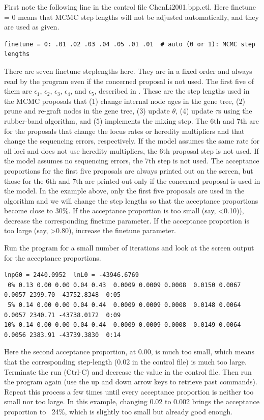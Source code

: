 \documentclass[a4paper]{book}
\numberwithin{equation}{section} \renewcommand{\baselinestretch}{0.55}
\begin{document}
First note the following line in the control file ChenLi2001.bpp.ctl.
Here finetune = 0 means that MCMC step lengths will not be adjusted
automatically, and they are used as given.
\begin{verbatim}
finetune = 0: .01 .02 .03 .04 .05 .01 .01  # auto (0 or 1): MCMC step lengths
\end{verbatim}
There are seven finetune steplengths here.  They are in a fixed order
and always read by the program even if the concerned proposal is not
used.  The first five of them are $\epsilon_1$, $\epsilon_2$,
$\epsilon_3$, $\epsilon_4$, and $\epsilon_5$, described in
\citep{Rannala2003}. These are the step lengths used in the MCMC
proposals that (1) change internal node ages in the gene tree, (2)
prune and re-graft nodes in the gene tree, (3) update $\theta$, (4)
update $\tau$s using the rubber-band algorithm, and (5) implements the
mixing step.  The 6th and 7th are for the proposals that change the
locus rates or heredity multipliers and that change the sequencing
errors, respectively.  If the model assumes the same rate for all loci
and does not use heredity multipliers, the 6th proposal step is not
used.  If the model assumes no sequencing errors, the 7th step is not
used.  The acceptance proportions for the first five proposals are
always printed out on the screen, but those for the 6th and 7th are
printed out only if the concerned proposal is used in the model.  In
the example above, only the first five proposals are used in the
algorithm and we will change the step lengths so that the acceptance
proportions become close to 30\%.  If the acceptance proportion is too
small (say, <0.10)), decrease the corresponding finetune parameter.
If the acceptance proportion is too large (say, >0.80), increase the
finetune parameter.

Run the program for a small number of iterations and look at the
screen output for the acceptance proportions.
{\small
\begin{verbatim}
lnpG0 = 2440.0952  lnL0 = -43946.6769
 0% 0.13 0.00 0.00 0.04 0.43  0.0009 0.0009 0.0008  0.0150 0.0067 0.0057 2399.70 -43752.8348  0:05
 5% 0.14 0.00 0.00 0.04 0.44  0.0009 0.0009 0.0008  0.0148 0.0064 0.0057 2340.71 -43738.0172  0:09
10% 0.14 0.00 0.00 0.04 0.44  0.0009 0.0009 0.0008  0.0149 0.0064 0.0056 2383.91 -43739.3830  0:14
\end{verbatim}
}
Here the second acceptance proportion, at 0.00, is much too small,
which means that the corresponding step-length (0.02 in the control
file) is much too large.  Terminate the run (Ctrl-C) and decrease the
value in the control file.  Then run the program again (use the up and
down arrow keys to retrieve past commands).  Repeat this process a few
times until every acceptance proportion is neither too small nor too
large.  In this example, changing 0.02 to 0.002 brings the acceptance
proportion to ~24\%, which is slightly too small but already good
enough.
\end{document}
